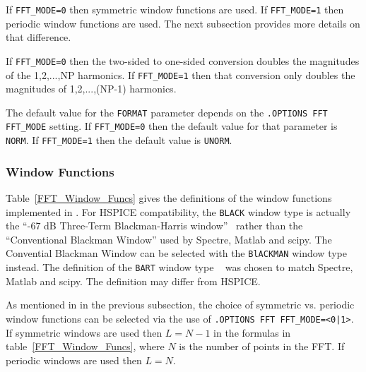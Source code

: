 If \texttt{FFT\_MODE=0} then symmetric window functions are used.  If
\texttt{FFT\_MODE=1} then periodic window functions are used.  The next
subsection provides more details on that difference.

If \texttt{FFT\_MODE=0} then the two-sided to one-sided conversion doubles
the magnitudes of the 1,2,...,NP harmonics. If \texttt{FFT\_MODE=1} then that
conversion only doubles the magnitudes of 1,2,...,(NP-1) harmonics.

The default value for the \texttt{FORMAT} parameter depends on the
\texttt{.OPTIONS FFT FFT\_MODE} setting.  If \texttt{FFT\_MODE=0} then
the default value for that parameter is {\tt NORM}. If \texttt{FFT\_MODE=1}
then the default value is {\tt UNORM}.

\subsubsection{Window Functions}
Table~\ref{FFT_Window_Funcs} gives the definitions of the window functions
implemented in \Xyce{}.  For HSPICE compatibility, the {\tt BLACK} window type
is actually the ``-67 dB Three-Term Blackman-Harris window''~\cite{Doerry2017}
rather than the ``Conventional Blackman Window'' used by Spectre, Matlab and scipy.
The Convential Blackman Window can be selected with the {\tt BlACKMAN} window
type instead.  The definition of the {\tt BART} window type ~\cite{oppenheimSchafer}
was chosen to match Spectre, Matlab and scipy.  The \Xyce{} definition may differ
from HSPICE.

As mentioned in in the previous subsection, the choice of symmetric vs. periodic
window functions can be selected via the use of \texttt{.OPTIONS FFT FFT\_MODE=<0|1>}.
If symmetric windows are used then $L = N-1$ in the formulas in
table~\ref{FFT_Window_Funcs}, where $N$ is the number of points in the FFT.
If periodic windows are used then $L=N$.


